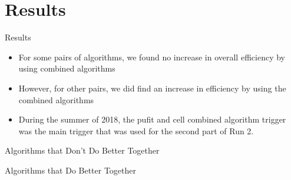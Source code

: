 \documentclass[]{beamer}
\begin{document}
\section{Results}
\begin{frame}{Results}
        \begin{itemize}
                \item For some pairs of algorithms, we found no increase in overall efficiency by using combined algorithms
                \item However, for other pairs, we did find an increase in efficiency by using the combined algorithms
				\item During the summer of 2018, the pufit and cell combined algorithm trigger was the main trigger that was used for the second part of Run 2.
        \end{itemize}
\end{frame}
\begin{frame}{Algorithms that Don't Do Better Together}
\end{frame}
\begin{frame}{Algorithms that Do Better Together}
\end{frame}
\end{document}
